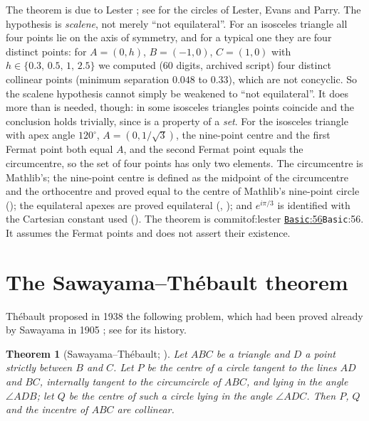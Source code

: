 \documentclass[11pt]{article}
\newtheorem{theorem}{Theorem}
\theoremstyle{definition}
\theoremstyle{remark}
\newcommand{\commitof}[1]{\csname commitof:#1\endcsname}
\newcommand{\repo}[1]{https://github.com/jpbald93/#1}
\newcommand{\src}[4]{\ifcsname commitof:#1\endcsname
  \href{\repo{#1}/blob/\commitof{#1}/#2/#3.lean\#L#4}{\texttt{#3}:#4}\else\texttt{#3}:#4\fi}
\begin{document}
The theorem is due to Lester \cite{lester1997}; see \cite{yiu2010} for the circles of Lester, Evans
and Parry. The hypothesis is \emph{scalene}, not merely ``not equilateral''. For an isosceles triangle
all four points lie on the axis of symmetry, and for a typical one they are four distinct points: for
$A=(0,h)$, $B=(-1,0)$, $C=(1,0)$ with $h\in\{0.3,\,0.5,\,1,\,2.5\}$ we computed (60 digits, archived script) four distinct collinear
points (minimum separation $0.048$ to $0.33$), which are not concyclic. So the scalene hypothesis cannot
simply be weakened to ``not equilateral''. It does more than is needed, though: in some isosceles
triangles points coincide and the conclusion holds trivially, since  is a property of
a \emph{set}. For the isosceles triangle with apex angle $120^\circ$, $A=(0,1/\sqrt3)$, the nine-point
centre and the first Fermat point both equal $A$, and the second Fermat point equals the circumcentre,
so the set of four points has only two elements.
The circumcentre is Mathlib's; the nine-point centre is defined as the midpoint of the circumcentre and
the orthocentre and proved equal to the centre of Mathlib's nine-point circle
(); the equilateral apexes are proved equilateral
(, ); and $e^{i\pi/3}$ is identified with the
Cartesian constant used (). The theorem is \src{lester}{Lester}{Basic}{56}. It
assumes the Fermat points and does not assert their existence.

\section{The Sawayama--Th\'ebault theorem}\label{sec:thebault}

Th\'ebault proposed in 1938 \cite{thebault1938} the following problem, which had been proved already
by Sawayama in 1905 \cite{sawayama1905}; see \cite{ayme2003} for its history.

\begin{theorem}[Sawayama--Th\'ebault; ]\label{thm:thebault}
Let $ABC$ be a triangle and $D$ a point strictly between $B$ and $C$. Let $P$ be the centre of a
circle tangent to the lines $AD$ and $BC$, internally tangent to the circumcircle of $ABC$, and lying in
the angle $\angle ADB$; let $Q$ be the centre of such a circle lying in the angle $\angle ADC$. Then
$P$, $Q$ and the incentre of $ABC$ are collinear.
\end{theorem}
\end{document}
